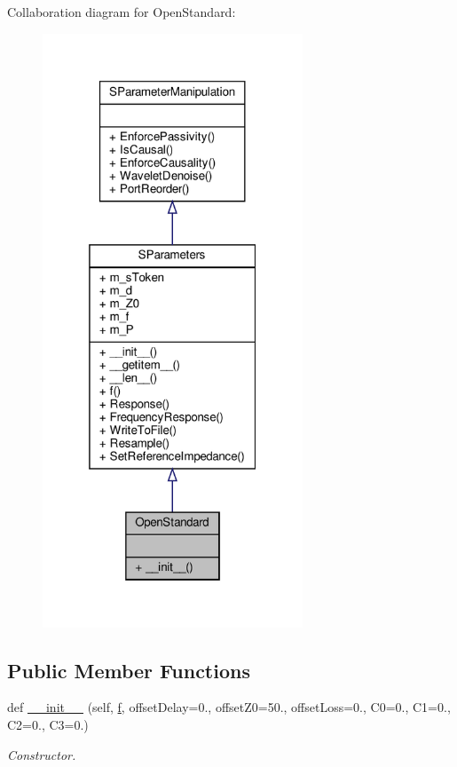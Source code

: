 Collaboration diagram for Open\+Standard\+:\nopagebreak
\begin{figure}[H]
\begin{center}
\leavevmode
\includegraphics[width=220pt]{classSignalIntegrity_1_1Measurement_1_1CalKit_1_1Standards_1_1OpenStandard_1_1OpenStandard__coll__graph}
\end{center}
\end{figure}
\subsection*{Public Member Functions}
\begin{DoxyCompactItemize}
\item 
def \hyperlink{classSignalIntegrity_1_1Measurement_1_1CalKit_1_1Standards_1_1OpenStandard_1_1OpenStandard_aac7db212cff48729c2956c6d050e941c}{\+\_\+\+\_\+init\+\_\+\+\_\+} (self, \hyperlink{classSignalIntegrity_1_1SParameters_1_1SParameters_1_1SParameters_a32e7a34d6837fe949b413c852a0447f8}{f}, offset\+Delay=0., offset\+Z0=50., offset\+Loss=0., C0=0., C1=0., C2=0., C3=0.)
\begin{DoxyCompactList}\small\item\em Constructor. \end{DoxyCompactList}\end{DoxyCompactItemize}


